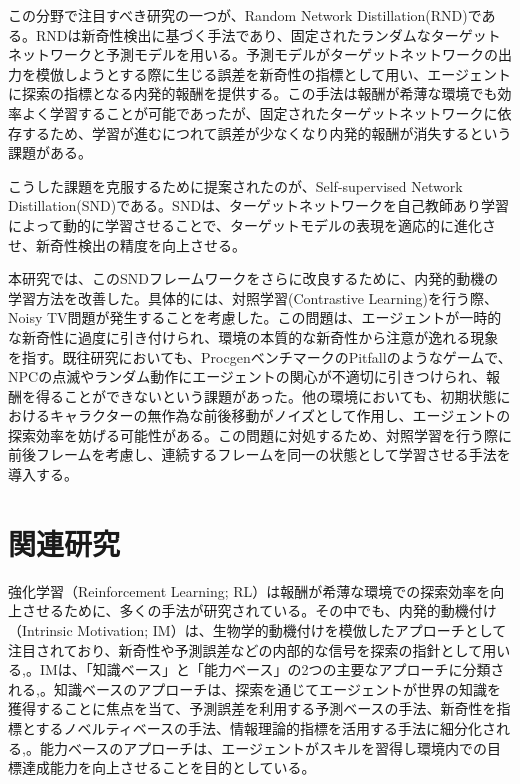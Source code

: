 この分野で注目すべき研究の一つが、Random Network Distillation(RND)\cite{RND}である。RNDは新奇性検出に基づく手法であり、固定されたランダムなターゲットネットワークと予測モデルを用いる。予測モデルがターゲットネットワークの出力を模倣しようとする際に生じる誤差を新奇性の指標として用い、エージェントに探索の指標となる内発的報酬を提供する。この手法は報酬が希薄な環境でも効率よく学習することが可能であったが、固定されたターゲットネットワークに依存するため、学習が進むにつれて誤差が少なくなり内発的報酬が消失するという課題がある。

こうした課題を克服するために提案されたのが、Self-supervised Network Distillation(SND)\cite{SND}である。SNDは、ターゲットネットワークを自己教師あり学習によって動的に学習させることで、ターゲットモデルの表現を適応的に進化させ、新奇性検出の精度を向上させる。

本研究では、このSNDフレームワークをさらに改良するために、内発的動機の学習方法を改善した。具体的には、対照学習(Contrastive Learning)を行う際、Noisy TV問題が発生することを考慮した。この問題は、エージェントが一時的な新奇性に過度に引き付けられ、環境の本質的な新奇性から注意が逸れる現象を指す。既往研究においても、ProcgenベンチマークのPitfallのようなゲームで、NPCの点滅やランダム動作にエージェントの関心が不適切に引きつけられ、報酬を得ることができないという課題があった\cite{SND}。他の環境においても、初期状態におけるキャラクターの無作為な前後移動がノイズとして作用し、エージェントの探索効率を妨げる可能性がある。この問題に対処するため、対照学習を行う際に前後フレームを考慮し、連続するフレームを同一の状態として学習させる手法を導入する。

\section{関連研究}
強化学習（Reinforcement Learning; RL）は報酬が希薄な環境での探索効率を向上させるために、多くの手法が研究されている。その中でも、内発的動機付け（Intrinsic Motivation; IM）は、生物学的動機付けを模倣したアプローチとして注目されており、新奇性や予測誤差などの内部的な信号を探索の指針として用いる\cite{RL},\cite{IM}。IMは、「知識ベース」と「能力ベース」の2つの主要なアプローチに分類される\cite{IM2},\cite{IM3}。知識ベースのアプローチは、探索を通じてエージェントが世界の知識を獲得することに焦点を当て、予測誤差を利用する予測ベースの手法、新奇性を指標とするノベルティベースの手法、情報理論的指標を活用する手法に細分化される\cite{UCEIM},\cite{IMS}。能力ベースのアプローチは、エージェントがスキルを習得し環境内での目標達成能力を向上させることを目的としている\cite{CDE}。

